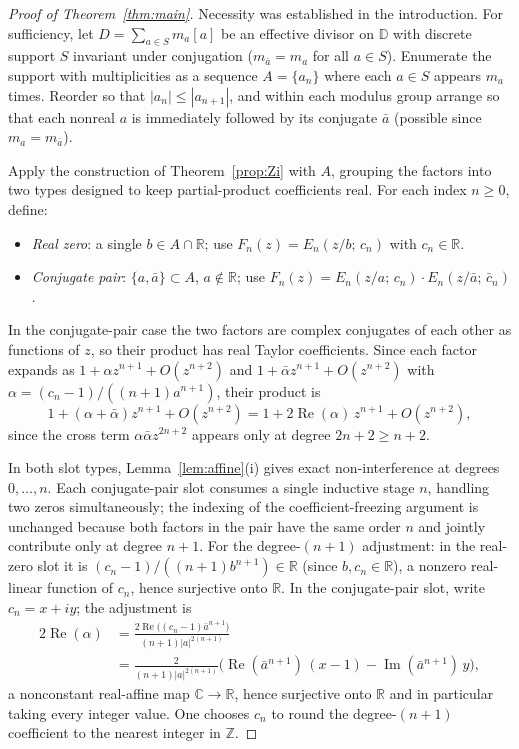 \documentclass{amsart}
\theoremstyle{definition}
\newcommand{\D}{\mathbb{D}}
\newcommand{\Z}{\mathbb{Z}}
\newcommand{\C}{\mathbb{C}}
\newcommand{\R}{\mathbb{R}}
\newcommand{\abs}[1]{\left|#1\right|}
\begin{document}
\begin{proof}[Proof of Theorem~\ref{thm:main}]
Necessity was established in the introduction.  For sufficiency, let
$D = \sum_{a \in S} m_a[a]$ be an effective divisor on $\D$ with
discrete support $S$ invariant under conjugation ($m_{\bar a} = m_a$
for all $a \in S$).  Enumerate the support with multiplicities as a
sequence $A = \{a_n\}$ where each $a \in S$ appears $m_a$ times.
Reorder so that $\abs{a_n} \leq \abs{a_{n+1}}$, and within each
modulus group arrange so that each nonreal $a$ is immediately followed
by its conjugate $\bar a$ (possible since $m_a = m_{\bar a}$).

Apply the construction of Theorem~\ref{prop:Zi} with $A$, grouping the
factors into two types designed to keep partial-product coefficients
real.  For each index $n \geq 0$, define:
\begin{itemize}
  \item \emph{Real zero}: a single $b \in A \cap \R$; use
        $F_n(z) = E_n(z/b;\,c_n)$ with $c_n \in \R$.
  \item \emph{Conjugate pair}: $\{a, \bar{a}\} \subset A$,
        $a \notin \R$; use
        $F_n(z) = E_n(z/a;\,c_n)\cdot E_n(z/\bar{a};\,\bar{c}_n)$.
\end{itemize}
In the conjugate-pair case the two factors are complex conjugates of each
other as functions of $z$, so their product has real Taylor coefficients.
Since each factor expands as $1 + \alpha z^{n+1} + O(z^{n+2})$ and
$1 + \bar\alpha z^{n+1} + O(z^{n+2})$ with
$\alpha = (c_n-1)/((n+1)a^{n+1})$, their product is
\[
  1 + (\alpha + \bar\alpha)z^{n+1} + O(z^{n+2})
  = 1 + 2\operatorname{Re}(\alpha)\,z^{n+1} + O(z^{n+2}),
\]
since the cross term $\alpha\bar\alpha z^{2n+2}$ appears only at degree
$2n+2 \geq n+2$.

In both slot types, Lemma~\ref{lem:affine}(i) gives exact non-interference
at degrees $0,\ldots,n$.  Each conjugate-pair slot consumes a single
inductive stage $n$, handling two zeros simultaneously; the indexing
of the coefficient-freezing argument is unchanged because both factors
in the pair have the same order $n$ and jointly contribute only at
degree $n+1$.  For the degree-$(n+1)$ adjustment: in the real-zero
slot it is $(c_n-1)/((n+1)b^{n+1}) \in \R$ (since $b, c_n \in \R$),
a nonzero real-linear function of $c_n$, hence surjective onto $\R$.
In the conjugate-pair slot, write $c_n = x + iy$; the adjustment is
\begin{align*}
  2\operatorname{Re}(\alpha)
  &= \frac{2\operatorname{Re}\bigl((c_n-1)\bar{a}^{n+1}\bigr)}{(n+1)\abs{a}^{2(n+1)}} \\
  &= \frac{2}{(n+1)\abs{a}^{2(n+1)}}
    \bigl(\operatorname{Re}(\bar{a}^{n+1})\,(x-1)
          - \operatorname{Im}(\bar{a}^{n+1})\,y\bigr),
\end{align*}
a nonconstant real-affine map $\C \to \R$, hence surjective onto $\R$
and in particular taking every integer value.  One chooses $c_n$ to
round the degree-$(n+1)$ coefficient to the nearest integer in $\Z$.


\end{proof}
\end{document}
